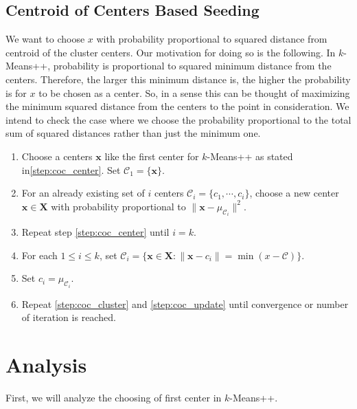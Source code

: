 \documentclass[twoside, 11pt]{article}
\newcommand{\x}{\mathbf{x}}
\newcommand{\X}{\mathbf{X}}
\newcommand{\C}{\mathcal{C}}
\begin{document}
	\subsection{Centroid of Centers Based Seeding}
	We want to choose $x$ with probability proportional to squared distance from centroid of the cluster centers. Our motivation for doing so is the following. In $k$-Means++, probability is proportional to squared minimum distance from the centers. Therefore, the larger this minimum distance is, the higher the probability is for $x$ to be chosen as a center. So, in a sense this can be thought of maximizing the minimum squared distance from the centers to the point in consideration. We intend to check the case where we choose the probability proportional to the total sum of squared distances rather than just the minimum one.
		\begin{enumerate}[i]
			\item Choose a centers $\x$ like the first center for $k$-Means++ as stated in\eqref{step:coc_center}. Set $\C_1=\{\x\}$.
			\item For an already existing set of $i$ centers $\mathcal{C}_i=\{c_1,\cdots,c_i\}$, choose a new center $\x\in\X$ with probability proportional to $\|\x-\mu_{\C_i}\|^2$.\label{step:coc_center}
			\item Repeat step \eqref{step:coc_center} until $i=k$.
			\item For each $1\leq i\leq k$, set $\C_i=\{\x\in\X:\|\x-c_i\|=\min(x-\C)\}$.\label{step:coc_cluster}
			\item Set $c_i=\mu_{\C_i}$.\label{step:coc_update}
			\item Repeat \eqref{step:coc_cluster} and \eqref{step:coc_update} until convergence or number of iteration is reached.
		\end{enumerate}
	\section{Analysis}
	First, we will analyze the choosing of first center in $k$-Means++. 
\end{document}
